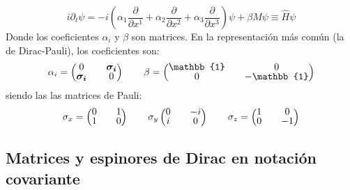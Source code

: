 \begin{equation}
i\partial _{t}\psi =-i\left( \alpha _{1}\dfrac{\partial }{\partial x^{1}}+\alpha _{2}\dfrac{\partial }{\partial x^{2}} + \alpha _{3}\dfrac{\partial }{\partial x^{3}}\right) \psi +\beta M\psi \equiv\widehat{H}\psi
\end{equation}
Donde los coeficientes $\alpha_i$ y $\beta$ son matrices. En la representación más común (la de Dirac-Pauli), los coeficientes son:
\begin{align*}
\alpha _{i}=
\begingroup 
\renewcommand*{\arraystretch}{0.8}
\setlength\arraycolsep{10pt}
\begin{pmatrix} 
0 & \boldsymbol{\sigma_{i}} \\ \boldsymbol{\sigma_{i}} & 0 \end{pmatrix} \qquad
\beta =\begin{pmatrix} \mathbb{1} & 0 \\ 0 & -\mathbb{1} \end{pmatrix}
\endgroup
\end{align*}
siendo las  las matrices de Pauli:
\begin{align*}
\sigma _{x}=
\begingroup 
\renewcommand*{\arraystretch}{0.8}
\setlength\arraycolsep{10pt}
\begin{pmatrix} 
0 & 1 \\ 1 & 0 \end{pmatrix} \qquad \sigma_y
\begin{pmatrix} 
0 & -i \\ i & 0 \end{pmatrix} \qquad
\sigma_z =\begin{pmatrix} 1 & 0 \\ 0 & -1 \end{pmatrix}
\endgroup
\end{align*}

\subsection{Matrices y espinores de Dirac en notación covariante}\label{cap:matrix_spinors}